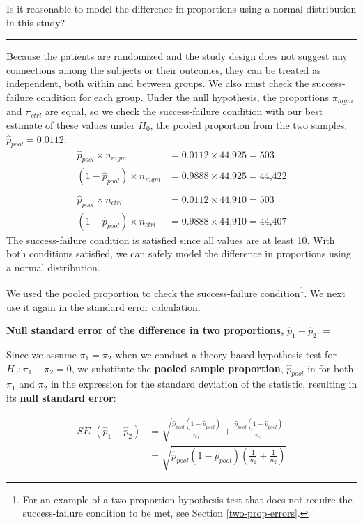 \documentclass[
  10pt,
  openany]{book}
\theoremstyle{definition}
\theoremstyle{definition}
\theoremstyle{definition}
\theoremstyle{definition}
\theoremstyle{remark}
\begin{document}
Is it reasonable to model the difference in proportions using a normal distribution in this study?

\begin{center}\rule{0.5\linewidth}{0.5pt}\end{center}

Because the patients are randomized and the study design does not suggest any connections among the subjects or their outcomes, they can be treated as independent, both within and between groups. We also must check the success-failure condition for each group. Under the null hypothesis, the proportions \(\pi_{mgm}\) and \(\pi_{ctrl}\) are equal, so we check the success-failure condition with our best estimate of these values under \(H_0\), the pooled proportion from the two samples, \(\hat{p}_{\textit{pool}} = 0.0112\): \begin{align*}
  \hat{p}_{\textit{pool}} \times n_{mgm}
      &= 0.0112 \times \text{44,925} = 503 \\
   (1 - \hat{p}_{\textit{pool}}) \times n_{mgm}
      &= 0.9888 \times \text{44,925} = \text{44,422} \\
  & \\
  \hat{p}_{\textit{pool}} \times n_{ctrl}
      &= 0.0112 \times \text{44,910} = 503 \\
   (1 - \hat{p}_{\textit{pool}}) \times n_{ctrl}
      &= 0.9888 \times \text{44,910} = \text{44,407}
  \end{align*} The success-failure condition is satisfied since all values are at least 10. With both conditions satisfied, we can safely model the difference in proportions using a normal distribution.

We used the pooled proportion to check the success-failure condition\footnote{For an example of a two proportion hypothesis test that does not require the success-failure condition to be met, see Section \ref{two-prop-errors}.}. We next use it again in the standard error calculation.

\textbf{Null standard error of the difference in two proportions,} \(\hat{p}_1 -\hat{p}_2\): =

Since we assume \(\pi_1 = \pi_2\) when we conduct a theory-based hypothesis test for \(H_0: \pi_1 - \pi_2 = 0\), we substitute the \textbf{pooled sample proportion}, \(\hat{p}_{pool}\) in for both \(\pi_1\) and \(\pi_2\) in the expression for the standard deviation of the statistic, resulting in its \textbf{null standard error}:

\begin{align*}
  SE_0(\hat{p}_1 -\hat{p}_2) &= \sqrt{\frac{\hat{p}_{pool}(1-\hat{p}_{pool})}{n_1} + \frac{\hat{p}_{pool}(1-\hat{p}_{pool})}{n_2}} \\
  &= \sqrt{\hat{p}_{pool}(1-\hat{p}_{pool})\left(\frac{1}{n_1} + \frac{1}{n_2}\right)}
  \end{align*}
\end{document}
